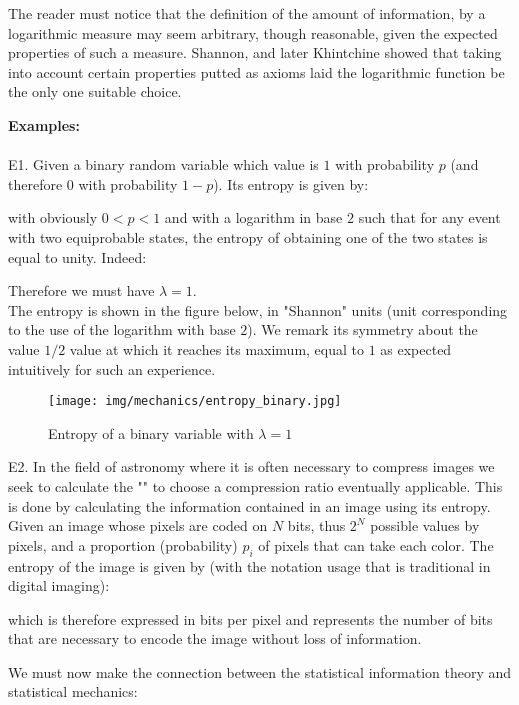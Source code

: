 	\begin{tcolorbox}[title=Remark,colframe=black,arc=10pt]
	The reader must notice that the definition of the amount of information, by a logarithmic measure may seem arbitrary, though reasonable, given the expected properties of such a measure. Shannon, and later Khintchine showed that taking into account certain properties putted as axioms laid the logarithmic function be the only one suitable choice.
	\end{tcolorbox}
	\pagebreak
	\begin{tcolorbox}[colframe=black,colback=white,sharp corners]
	\textbf{{\Large {}}Examples:}\\\\
	E1. Given a binary random variable which value is $1$ with probability $p$ (and therefore $0$ with probability $1-p$). Its entropy is given by:
	
	with obviously $0<p<1$ and with a logarithm in base $2$ such that for any event with two equiprobable states, the entropy of obtaining one of the two states is equal to unity. Indeed:
	
	Therefore we must have $\lambda=1$.\\
	
	The entropy is shown in the figure below, in "Shannon" units (unit corresponding to the use of the logarithm with base $2$). We remark its symmetry about the value $1/2$ value at which it reaches its maximum, equal to $1$ as expected intuitively for such an experience.
	\begin{figure}[H]
		\centering
		\texttt{[image: img/mechanics/entropy\_binary.jpg]}
		\caption{Entropy of a binary variable with $\lambda=1$}
	\end{figure}
	E2. In the field of astronomy where it is often necessary to compress images we seek to calculate the "" to choose a compression ratio eventually applicable. This is done by calculating the information contained in an image using its entropy. Given an image whose pixels are coded on $N$ bits, thus $2^N$ possible values by pixels, and a proportion (probability) $p_i$ of  pixels that can take each color. The entropy of the image is given by (with the notation usage that is traditional in digital imaging):
	
	which is therefore expressed in bits per pixel and represents the number of bits that are necessary to encode the image without loss of information.
	\end{tcolorbox}
	We must now make the connection between the statistical information theory and statistical mechanics:
	
